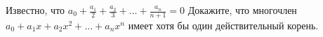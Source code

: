 \documentclass{article}
\begin{document}
Известно, что $a_0 + \frac{a_1}{2} + \frac{a_2}{3} + \ldots + \frac{a_n}{n+1}=0$
Докажите, что многочлен $a_0 + a_1 x + a_2 x^2 + \ldots + a_n x^n$ имеет хотя бы один действительный корень.
\end{document}
